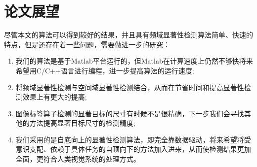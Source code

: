 \section{论文展望}
\label{5_2}

尽管本文的算法可以得到较好的结果，并且具有频域显著性检测算法简单、快速的特点，但是还存在着一些问题，需要做进一步的研究：
\begin{enumerate}
\item 我们的算法是基于Matlab平台运行的，但Matlab在计算速度上仍然不够快将来希望用C/C++语言进行编程，进一步提高算法的运行速度;
\item 将频域显著性检测与空间域显著性检测结合，从而在节省时间和提高显著性检测效果上有更大的提高;
\item 图像标签算子检测的显著目标的尺寸有时候不是很精确，下一步我们会寻找其他的方法提高显著目标尺寸的检测精度;
\item 我们采用的是自底向上的显著性检测算法，即完全靠数据驱动，将来希望将受意识支配、依赖于具体任务的自顶向下的方法加入进来，从而使检测结果更加全面，更符合人类视觉系统的处理方式。
\end{enumerate}













































